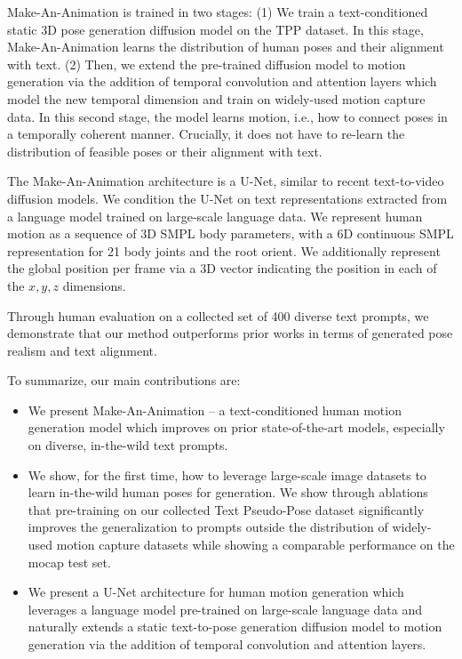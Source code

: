 \documentclass[10pt,twocolumn,letterpaper]{article}
\begin{document}
Make-An-Animation is trained in two stages: (1) We train a text-conditioned static 3D pose generation diffusion model on the TPP dataset. In this stage, Make-An-Animation learns the distribution of human poses and their alignment with text. (2) Then, we extend the pre-trained diffusion model to motion generation via the addition of temporal convolution and attention layers which model the new temporal dimension and train on widely-used motion capture data. In this second stage, the model learns motion, i.e., how to connect poses in a temporally coherent manner. Crucially, it does not have to re-learn the distribution of feasible poses or their alignment with text. 

The Make-An-Animation architecture is a U-Net, similar to recent text-to-video diffusion models. We condition the U-Net on text representations extracted from a language model trained on large-scale language data. We represent human motion as a sequence of 3D SMPL body parameters, with a 6D continuous SMPL representation for 21 body joints and the root orient. We additionally represent the global position per frame via a 3D vector indicating the position in each of the $x, y, z$ dimensions.

Through human evaluation on a collected set of 400 diverse text prompts, we demonstrate that our method outperforms prior works in terms of generated pose realism and text alignment. 

To summarize, our main contributions are:
\begin{itemize}
    \item We present Make-An-Animation -- a text-conditioned human motion generation model which improves on prior state-of-the-art models, especially on diverse, in-the-wild text prompts.
    \item We show, for the first time, how to leverage large-scale image datasets to learn in-the-wild human poses for generation. We show through ablations that pre-training on our collected Text Pseudo-Pose dataset significantly improves the generalization to prompts outside the distribution of widely-used motion capture datasets while showing a comparable performance on the mocap test set.
    \item We present a U-Net architecture for human motion generation which leverages a language model pre-trained on large-scale language data and naturally extends a static text-to-pose generation diffusion model to motion generation via the addition of temporal convolution and attention layers. 
\end{itemize}
\end{document}
